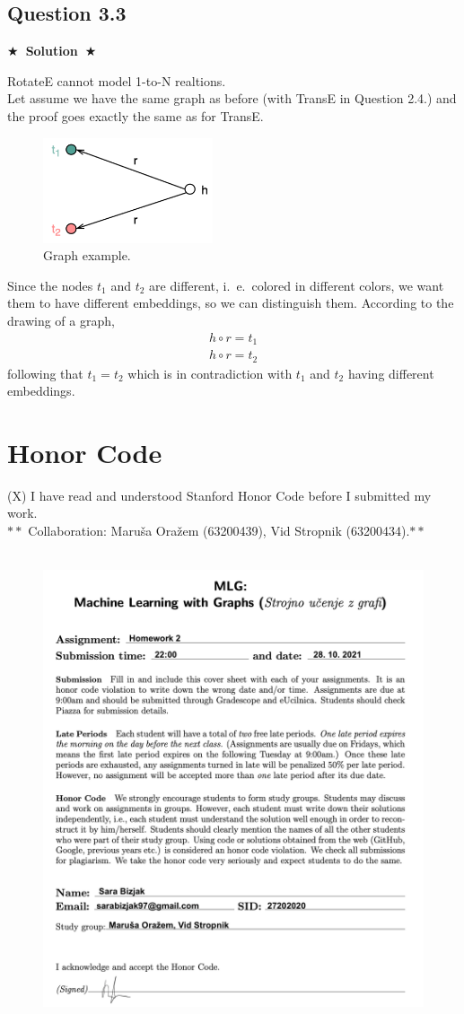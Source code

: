 \documentclass{article}
\newcommand{\Solution}[1]{{\medskip \color{black} \bf $\bigstar$~\sf \textbf{Solution}~$\bigstar$ \sf #1 } \bigskip}
\begin{document}
\subsection*{Question 3.3}
\Solution{

  \noindent
  RotateE cannot model 1-to-N realtions.
  \\
  Let assume we have the same graph as before (with TransE in Question 2.4.) and the proof goes exactly the same as for TransE.
  \begin{figure}[ht!]
    \centering
    \includegraphics[width=50mm]{Slike/2_4.png}
    \caption{Graph example.}
  \end{figure}
Since the nodes $t_1$ and $t_2$ are different, i.~e.~colored in different colors, we want them to have different embeddings, so we can distinguish them.
According to the drawing of a graph, 
\begin{align*}
  h \circ r = t_1
  \\
  h \circ r = t_2
\end{align*}
following that $t_1 = t_2$ which is in contradiction with $t_1$ and $t_2$ having different embeddings.
}


\section{Honor Code}
(X) I have read and understood Stanford Honor Code before I submitted my work.
\\ $**$ Collaboration: Maruša Oražem (63200439), Vid Stropnik (63200434).$**$
\\
\\
\begin{figure}[ht!]
  \centering
  \includegraphics[width=120mm]{Slike/cover.png}
\end{figure}
\end{document}
